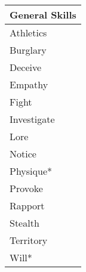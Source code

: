 \documentclass[12pt,a4paper]{article}
\newcommand{\MyTextField}[2][]{%
  \TextField[borderwidth=0,backgroundcolor={},#1]{#2}%
}
\begin{document}
\noindent
\begin{minipage}{0.45\linewidth}
\begin{tabular}{|l|p{2cm}|}
\hline
\multicolumn{2}{|c|}{\textbf{General Skills}} \\ \hline
Athletics & \MyTextField[name=Athletics,width=\linewidth]{}\\ \hline
Burglary & \MyTextField[name=Burglary,width=\linewidth]{} \\ \hline
Deceive & \MyTextField[name=Deceive,width=\linewidth]{}\\ \hline
Empathy & \MyTextField[name=Empathy,width=\linewidth]{}\\ \hline
Fight & \MyTextField[name=Fight,width=\linewidth]{}\\ \hline
Investigate & \MyTextField[name=Investigate,width=\linewidth]{}\\ \hline
Lore & \MyTextField[name=Lore,width=\linewidth]{}\\ \hline
Notice & \MyTextField[name=Notice,width=\linewidth]{}\\ \hline
Physique* & \MyTextField[name=Physique,width=\linewidth]{} \\ \hline
Provoke & \MyTextField[name=Provoke,width=\linewidth]{} \\ \hline
Rapport & \MyTextField[name=Rapport,width=\linewidth]{}\\ \hline
Stealth & \MyTextField[name=Stealth,width=\linewidth]{}\\ \hline
Territory & \MyTextField[name=Territory,width=\linewidth]{}\\ \hline
Will* & \MyTextField[name=Will,width=\linewidth]{}\\ \hline
\end{tabular}
\end{minipage}
\hfill
\end{document}
